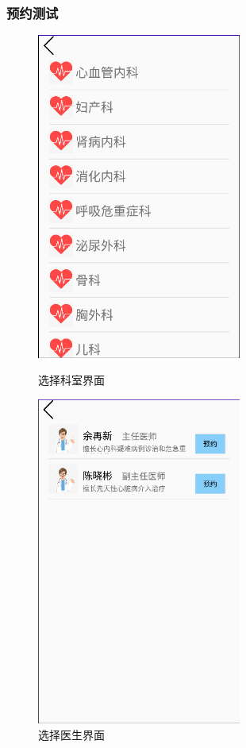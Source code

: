 \documentclass[UTF8,12pt]{article}
\begin{document}
\newpage

\subsubsection{预约测试}

\begin{figure}[htbp]
    \begin{minipage}[t]{0.45\textwidth}
        \centering
        \includegraphics[width=0.6\textwidth]{imgs/21.png}
        \caption{选择科室界面}
    \end{minipage}%
    \begin{minipage}[t]{0.45\textwidth}
        \centering
        \includegraphics[width=0.6\textwidth]{imgs/22.png}
        \caption{选择医生界面}
    \end{minipage}
\end{figure}
\end{document}
